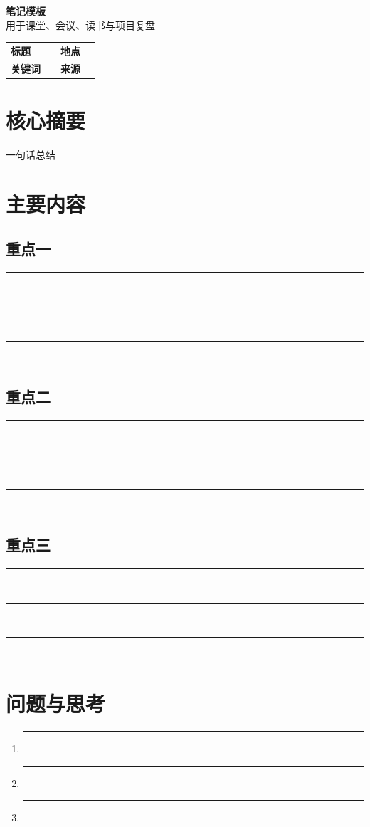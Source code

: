 \documentclass[11pt,a4paper]{ctexart}
\newcommand{\noteline}{\rule{\linewidth}{0.4pt}\\[0.9em]}
\begin{document}
\begin{center}
  {\Huge\bfseries 笔记模板}\\[0.35em]
  {\large 用于课堂、会议、读书与项目复盘}
\end{center}

\vspace{0.8em}

\begin{tabularx}{\textwidth}{@{}lX lX@{}}
  \textbf{标题} & \underline{\hspace{6.5cm}} &
  \textbf{地点} & \underline{\hspace{4cm}} \\
  \textbf{关键词} & \underline{\hspace{6.5cm}} &
  \textbf{来源} & \underline{\hspace{4cm}} \\
\end{tabularx}

\section{核心摘要}
\begin{notebox}{一句话总结}
  \vspace{1.6cm}
\end{notebox}

\section{主要内容}
\subsection{重点一}
\noteline
\noteline
\noteline

\subsection{重点二}
\noteline
\noteline
\noteline

\subsection{重点三}
\noteline
\noteline
\noteline

\section{问题与思考}
\begin{enumerate}
  \item \noteline
  \item \noteline
  \item \noteline
\end{enumerate}
\end{document}
